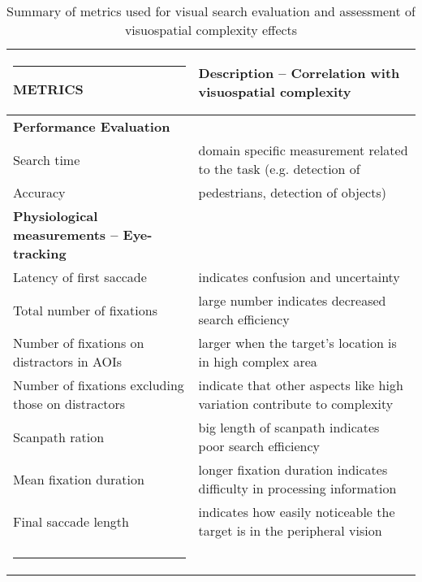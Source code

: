 \documentclass[a4paper]{article}
\makeatletter
\def\hlinewd#1{%
  \noalign{\ifnum0=`}\fi\hrule \@height #1 \futurelet
   \reserved@a\@xhline}
\makeatother
\begin{document}
 {
 \begin{table}[t]
 \renewcommand{\arraystretch}{1.1}
 \begin{center}
 \scriptsize\sffamily
 \begin{tabular}{>{\columncolor[gray]{0.92}}l l}
 \hlinewd{1pt}
\rowcolor[gray]{.92} \textbf{METRICS} & \textbf{Description -- Correlation with visuospatial complexity} \\\hline\hline
 
 \textbf{Performance Evaluation}     &  \\[0.2 pt] 
 \hline
 
 Search time  & domain specific measurement related to the task  (e.g. detection of   \\
 Accuracy  & pedestrians, detection of objects) \\
 
 \hline
 \textbf{Physiological measurements -- Eye-tracking}     &  \\
 \hline
 
 Latency of first saccade & indicates confusion and uncertainty\\
 
 Total number of fixations &  large number indicates decreased search efficiency \\
 
 Number of fixations on distractors in AOIs & larger when the target's location is in high complex area  \\
 
 Number of fixations excluding those on distractors & indicate that other aspects like high variation contribute to complexity \\
 
  Scanpath ration & big length of scanpath indicates poor search efficiency   \\
 
 Mean fixation duration &  longer fixation duration indicates difficulty in processing information \\
 
 Final saccade length & indicates how easily noticeable the target is in the peripheral vision \\
 
 \hlinewd{1pt}
 \end{tabular}
 \caption{{\sffamily\footnotesize Summary of metrics used for visual search evaluation and assessment of visuospatial complexity effects}}
 \label{metrics}
 \end{center}
 \end{table}%
 }
\end{document}
